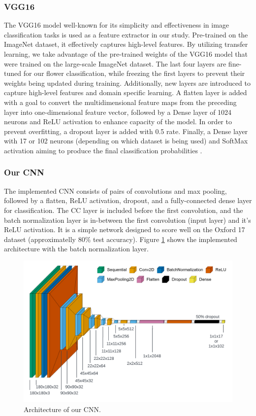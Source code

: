 \subsubsection{VGG16}
The VGG16 model \cite{SimonyanVGG} well-known for its simplicity and effectiveness in image classification tasks \cite{SimonyanVGG} is used as a feature extractor in our study. Pre-trained on the ImageNet dataset, it effectively captures high-level features.
By utilizing transfer learning, we take advantage of the pre-trained weights of the VGG16 model that were trained on the large-scale ImageNet dataset.
The last four layers are fine-tuned for our flower classification, while freezing the first layers to prevent their weights being updated during training. Additionally, new layers are introduced to capture high-level features and domain specific learning.
A flatten layer is added with a goal to convert the multidimensional feature maps from the preceding layer into one-dimensional feature vector, followed by a Dense layer of 1024 neurons and ReLU activation to enhance capacity of the model. 
In order to prevent overfitting, a dropout layer is added with 0.5 rate. Finally, a Dense layer with 17 or 102 neurons (depending on which dataset is being used) and SoftMax activation aiming to produce the final classification probabilities \cite{kaggle_flower_cnn}.

\subsubsection{Our CNN}

The implemented \gls{CNN} consists of pairs of convolutions and max pooling, followed by a flatten, ReLU activation, dropout, and a fully-connected dense layer for classification.
The \gls{CC} layer is included before the first convolution, and the batch normalization layer is in-between the first convolution (input layer) and it's ReLU activation.
It is a simple network designed to score well on the Oxford 17 dataset (approximatelly $80\%$ test accuracy). Figure \ref{fig:our_cnn} shows the implemented architecture with the batch normalization layer.


\begin{figure}[ht]
    \centering
    \includegraphics[width=\textwidth]{images/ours_architecture.png}
    \caption{Architecture of our CNN.}
    \label{fig:our_cnn}
\end{figure}